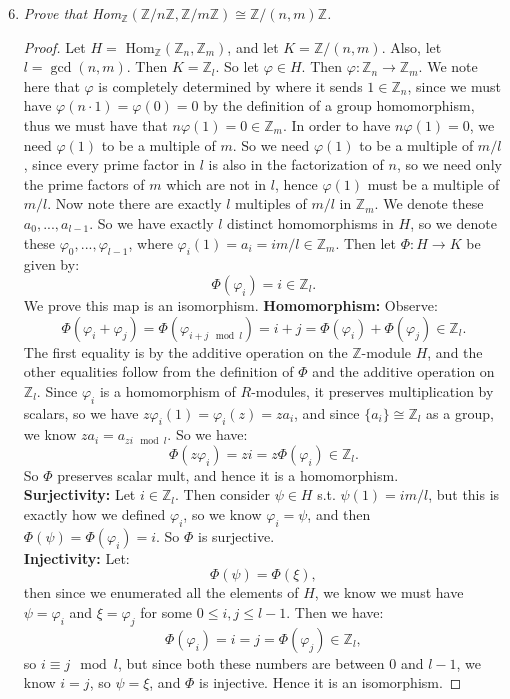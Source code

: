 \documentclass[9pt,reqno,twoside]{amsbook}
\theoremstyle{plain}
\numberwithin{section}{chapter}
\numberwithin{equation}{chapter}
\theoremstyle{definition}
\theoremstyle{remark}
\theoremstyle{plain}
\newcommand{\z}{\mathbb{Z}}
\renewcommand{\leq}{\leqslant}
\renewcommand{\phi}{\varphi}
\begin{document}
\begin{enumerate}[label=\arabic*.]
\setcounter{enumi}{5}
\item \textit{Prove that Hom$_\z(\z/n\z,\z/m\z) \cong \z/(n,m)\z$. }

\begin{proof}
Let $H = $ Hom$_\z(\z_n,\z_m)$, and let $K = \z/(n,m)$. Also, let $l = \gcd(n,m)$. Then $K = \z_l$. So let $\phi \in H$. Then $\phi:\z_n \to \z_m$. We note here that $\phi$ is completely determined by where it sends $1 \in \z_n$, since we must have $\phi(n\cdot 1) = \phi(0) = 0$ by the definition of a group homomorphism, thus we must have that $n\phi(1) = 0 \in \z_m$. In order to have $n\phi(1) = 0$, we need $\phi(1)$ to be a multiple of $m$. So we need $\phi(1)$ to be a multiple of $m/l$, since every prime factor in $l$ is also in the factorization of $n$, so we need only the prime factors of $m$ which are not in $l$, hence $\phi(1)$ must be a multiple of $m/l$. Now note there are exactly $l$ multiples of $m/l$ in $\z_m$. We denote these $a_0,...,a_{l - 1}$. So we have exactly $l$ distinct homomorphisms in $H$, so we denote these $\phi_0,...,\phi_{l - 1}$, where $\phi_i(1) = a_i = im/l \in \z_m$. Then let $\Phi: H \to K$ be given by:
$$
\Phi(\phi_i) = i \in \z_l.
$$
We prove this map is an isomorphism. 
\textbf{Homomorphism: } Observe: 
$$
\Phi(\phi_i + \phi_j) = \Phi(\phi_{i + j \mod l}) = i + j = \Phi(\phi_i) + \Phi(\phi_j) \in \z_l.
$$
The first equality is by the additive operation on the $\z$-module $H$, and the other equalities follow from the definition of $\Phi$ and the additive operation on $\z_l$. Since $\phi_i$ is a homomorphism of $R$-modules, it preserves multiplication by scalars, so we have $z\phi_i(1) = \phi_i(z) = za_i$, and since $\{a_i\} \cong \z_l$ as a group, we know $za_i = a_{zi \mod l}$. So we have:
$$
\Phi(z\phi_i) = zi = z\Phi(\phi_i) \in \z_l.
$$
So $\Phi$ preserves scalar mult, and hence it is a homomorphism. \\
\textbf{Surjectivity: } Let $i \in \z_l$. Then consider $\psi \in H$ s.t. $\psi(1) = im/l$, but this is exactly how we defined $\phi_i$, so we know $\phi_i = \psi$, and then $\Phi(\psi) = \Phi(\phi_i) = i$. So $\Phi$ is surjective. \\
\textbf{Injectivity: }Let: 
$$
\Phi(\psi) = \Phi(\xi),
$$
then since we enumerated all the elements of $H$, we know we must have $\psi = \phi_i$ and $\xi = \phi_j$ for some $0 \leq i,j \leq l - 1$. Then we have: 
$$
\Phi(\phi_i) = i = j = \Phi(\phi_j) \in \z_l,
$$
so $i \equiv j \mod l$, but since both these numbers are between $0$ and $l - 1$, we know $i  =j$, so $\psi = \xi$, and $\Phi$ is injective. Hence it is an isomorphism. 
\end{proof}


\end{enumerate}
\end{document}
